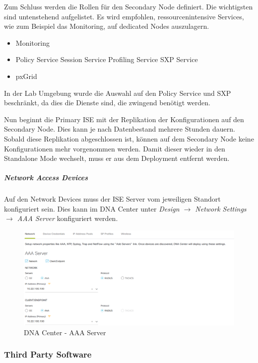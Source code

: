 Zum Schluss werden die Rollen für den Secondary Node definiert. Die wichtigsten sind untenstehend aufgelistet. Es wird empfohlen, ressourcenintensive Services, wie zum Beispiel das Monitoring, auf dedicated Nodes auszulagern.

\begin{itemize}
	\item Monitoring
	\item Policy Service
	\subitem Session Service
	\subitem Profiling Service
	\subitem SXP Service
	\item pxGrid
\end{itemize}

In der Lab Umgebung wurde die Auswahl auf den Policy Service und SXP beschränkt, da dies die Dienste sind, die zwingend benötigt werden. 

Nun beginnt die Primary ISE mit der Replikation der Konfigurationen auf den Secondary Node. Dies kann je nach Datenbestand mehrere Stunden dauern. Sobald diese Replikation abgeschlossen ist, können auf dem Secondary Node keine Konfigurationen mehr vorgenommen werden. Damit dieser wieder in den Standalone Mode wechselt, muss er aus dem Deployment entfernt werden.

\subparagraph{Network Access Devices}

Auf den Network Devices muss der ISE Server vom jeweiligen Standort konfiguriert sein. Dies kann im DNA Center unter \textit{Design $\rightarrow$ Network Settings $\rightarrow$ AAA Server} konfiguriert werden.

\begin{figure}[H]
	\centering
	\includegraphics[width=0.9\linewidth]{img/Absicherung/DNA_Center_AAA-Server.png}
	\caption{DNA Center - AAA Server }
	\label{fig:DNA Center - AAA Server}
\end{figure}


\subsubsection{Third Party Software}

